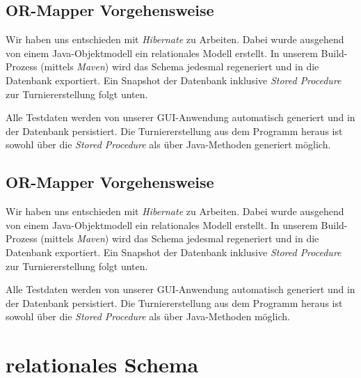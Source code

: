\documentclass[11pt,german]{scrartcl}
\begin{document}
\subsection*{OR-Mapper Vorgehensweise}
Wir haben uns entschieden mit \emph{Hibernate} zu Arbeiten. Dabei wurde ausgehend von einem Java-Objektmodell ein relationales Modell erstellt. In unserem Build-Prozess (mittels \emph{Maven}) wird das Schema jedesmal regeneriert und in die Datenbank exportiert. Ein Snapshot der Datenbank inklusive \emph{Stored Procedure} zur Turniererstellung folgt unten.

Alle Testdaten werden von unserer GUI-Anwendung automatisch generiert und in der Datenbank persistiert. Die Turniererstellung  aus dem Programm heraus ist sowohl über die \emph{Stored Procedure} als über Java-Methoden generiert möglich.

\subsection*{OR-Mapper Vorgehensweise}
Wir haben uns entschieden mit \emph{Hibernate} zu Arbeiten. Dabei wurde ausgehend von einem Java-Objektmodell ein relationales Modell erstellt. In unserem Build-Prozess (mittels \emph{Maven}) wird das Schema jedesmal regeneriert und in die Datenbank exportiert. Ein Snapshot der Datenbank inklusive \emph{Stored Procedure} zur Turniererstellung folgt unten.

Alle Testdaten werden von unserer GUI-Anwendung automatisch generiert und in der Datenbank persistiert. Die Turniererstellung  aus dem Programm heraus ist sowohl über die \emph{Stored Procedure} als über Java-Methoden möglich.

\section*{relationales Schema}
\end{document}

